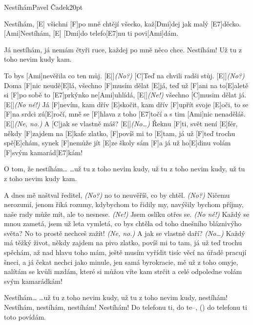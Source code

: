 \begin{song}{Nestíhám}{Pavel Čadek}{20pt}%
\begin{multicols}{2}%
\chorus%
[Ami]Nestíhám, [E]{}
všichni [F]po mně chtějí všecko,
kaž[Dmi]dej jak malý [E7]děcko.
[Ami]Nestíhám, [E]{}
[Dmi]do telefo[E7]nu ti povi[Ami]dám.

Já nestíhám,
já nemám čtyři ruce,
každej po mně něco chce.
Nestíhám!
Už tu z toho nevim kudy kam.

%
To bys [Ami]nevěřila co ten můj. [E|]{}\emph{(No?)}
[C]Teď na chvili radši stůj. [E|]{}\emph{(No?)}
Doma [F]nic neudě[E]lá,
všechno [F]musím dělat [E]já,
teď už [F]ani na to[E]aletě si
[F]po sobě to [E7]prkýnko
ne[Ami]uhlídá, [E|]{}\emph{(Ne!)}
všechno [C]musim dělat já. [E|]{}\emph{(No né!)}
Já [F]nevím, kam dřív [E]skočit,
kam dřív [F]upřít svoje [E]oči,
to se [F]na srdci zú[E]ročí,
mně se [F]hlava z toho [E7]točí
a s tim [Ami]nic nenaděláš. [E|]{}\emph{(Ne, no.)}
A [C]jak se vlastně máš? [E|]{}\emph{(No\dots)}
Řeknu [F]ti, svět není [E]fér,
někdy [F]zajdem na [E]kafe
zlatko, [F]povíš mi to [E]tam,
já už [F]teď trochu spě[E]chám,
synek [F]nemůže jít [E]ze školy sám
[F]a já už ho[E]dinu volám
[F]svým kamarád[E7]kám!

\chorus%
O tom, že nestíhám\dots
\dots už tu z toho nevim kudy,
už tu z toho nevim kudy,
už tu z toho nevim kudy kam.

%
A dnes mě naštval ředitel, \emph{(No?)}
no to neuvěříš, co by chtěl. \emph{(No?)}
Ničemu nerozumí,
jenom řiká rozumy,
kdybychom to řidily my,
navýšily bychom příjmy,
naše rady může mít,
ale to nesnese. \emph{(Ne!)}
Jsem oslíku otřes se. \emph{(No né!)}
Každý se mnou zametá,
jsem už leta vymletá,
co bys chtěla od toho dnešního
bláznivýho světa?
No to prostě nechceš zažít! \emph{(Ne, no.)}
A jak se vlastně daří? \emph{(No\dots)}
Každý má těžký život,
někdy zajdem na pivo
zlatko, povíš mi to tam,
já už teď trochu spěchám,
až nad hlavu toho mám,
ještě musím vyřídit tisíc
věcí na úřadě pracují
šneci, a já čekat nechci
jako minule, jen samá
byrokracie,
mě už z toho omyje,
nalítám se kvůli mzdám, které si
můžou víte kam strčit
a celé odpoledne volám
svým kamarádkám!

\chorus%
Nestíhám\dots
\dots už tu z toho nevim kudy,
už tu z toho nevim kudy,
nestíhám!
Nestíhám, nestíhám, nestíhám!
Nestíhám!
Do telefonu ti, do te--, ()
do telefonu ti toto
povídám.
\end{multicols}
\end{song}
\restoregeometry
